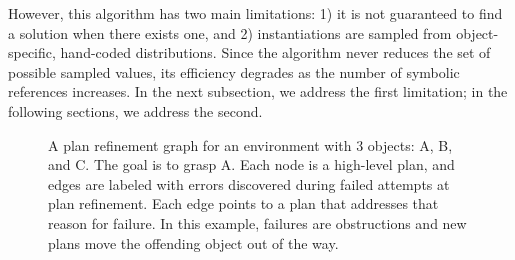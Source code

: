 However, this algorithm has two
main limitations: 1) it is not guaranteed to find a solution when
there exists one, and 2) instantiations
are sampled from object-specific, hand-coded distributions. Since the algorithm
never reduces the set of possible sampled values, its
efficiency degrades as the number of symbolic references increases. In the next subsection,
we address the first limitation; in the following sections, we address the second.

\begin{figure}[t]
  \centering
  \caption{\small{A plan refinement graph for an environment with 3
      objects: A, B, and C. The goal is to grasp A. Each node is a
      high-level plan, and edges are labeled with errors discovered during
      failed attempts at plan refinement. Each edge points to a plan
      that addresses that reason for failure. In this example, failures
      are obstructions and new plans move the offending object out of
      the way.}}
  \label{fig:prg}
\end{figure}

